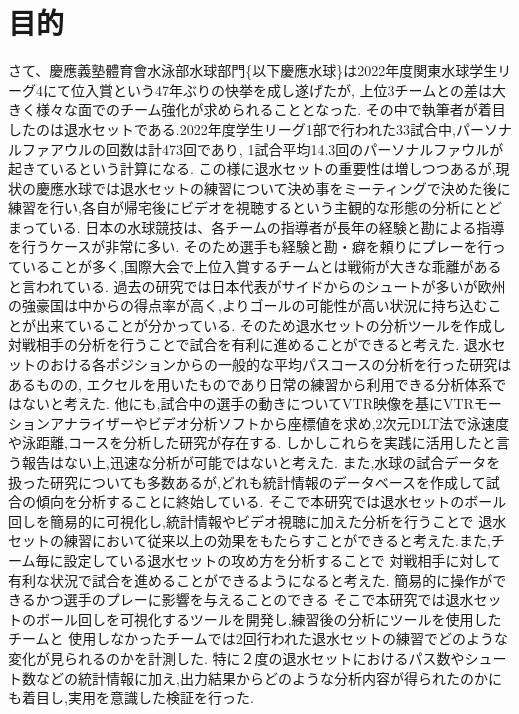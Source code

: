\documentclass[../main.tex]{subfiles}
\begin{document}
\section{目的}
さて、慶應義塾體育會水泳部水球部門\{以下慶應水球\}は2022年度関東水球学生リーグ4にて位入賞という47年ぶりの快挙を成し遂げたが,
上位3チームとの差は大きく様々な面でのチーム強化が求められることとなった.
その中で執筆者が着目したのは退水セットである.2022年度学生リーグ1部で行われた33試合中,パーソナルファアウルの回数は計473回であり,
1試合平均14.3回のパーソナルファウルが起きているという計算になる.
この様に退水セットの重要性は増しつつあるが,現状の慶應水球では退水セットの練習について決め事をミーティングで決めた後に
練習を行い,各自が帰宅後にビデオを視聴するという主観的な形態の分析にとどまっている.
日本の水球競技は、各チームの指導者が長年の経験と勘による指導を行うケースが非常に多い.\cite{原朗2005水球競技の長期一貫指導型競技者育成プログラム}
そのため選手も経験と勘・癖を頼りにプレーを行っていることが多く,国際大会で上位入賞するチームとは戦術が大きな乖離があると言われている.\cite{榎本至2005水球競技のノーティカルチャート}
過去の研究では日本代表がサイドからのシュートが多いが欧州の強豪国は中からの得点率が高く,よりゴールの可能性が高い状況に持ち込むことが出来ていることが分かっている.\cite{高木英樹1988092o09}\cite{洲雅明2018水球競技における相手退水時の攻撃分析}
そのため退水セットの分析ツールを作成し対戦相手の分析を行うことで試合を有利に進めることができると考えた.
退水セットのおける各ポジションからの一般的な平均パスコースの分析を行った研究はあるものの\cite{洲雅明2016水球競技における退水時攻撃のディフェンスの崩しについて},
エクセルを用いたものであり日常の練習から利用できる分析体系ではないと考えた.
他にも,試合中の選手の動きについてVTR映像を基にVTRモーションアナライザーやビデオ分析ソフトから座標値を求め,2次元DLT法で泳速度や泳距離,コースを分析した研究が存在する.\cite{椿本1987水球のゲーム分析}\cite{清水信貴2007水球競技におけるルール改正に伴うゲーム構造の変化に関する研究}\cite{丸山博史水球競技における選手及びボールの移動からみたチームパフォーマンス}\cite{椿本昇三19839043}\cite{福中賢一女子水球選手の国際試合における試合分析}\cite{椿本昇三1987091219}
しかしこれらを実践に活用したと言う報告はない上,迅速な分析が可能ではないと考えた.
また,水球の試合データを扱った研究についても多数あるが,どれも統計情報のデータベースを作成して試合の傾向を分析することに終始している.\cite{洲雅明2013ロンドンオリンピックにおける水球競技のデータ分析}\cite{洲雅明2021水球男子日本チームの世界選手権}\cite{宮城進1985水球競技におけるゲーム分析}\cite{weko_1697_1}\cite{南隆尚1995水球競技におけるゲーム分析}\cite{宮城進1985093231}\cite{榎本至1998095c03102}\cite{高山誠1985093230}
そこで本研究では退水セットのボール回しを簡易的に可視化し,統計情報やビデオ視聴に加えた分析を行うことで
退水セットの練習において従来以上の効果をもたらすことができると考えた.また,チーム毎に設定している退水セットの攻め方を分析することで
対戦相手に対して有利な状況で試合を進めることができるようになると考えた.
簡易的に操作ができるかつ選手のプレーに影響を与えることのできる
そこで本研究では退水セットのボール回しを可視化するツールを開発し,練習後の分析にツールを使用したチームと
使用しなかったチームでは2回行われた退水セットの練習でどのような変化が見られるのかを計測した.
特に２度の退水セットにおけるパス数やシュート数などの統計情報に加え,出力結果からどのような分析内容が得られたのかにも着目し,実用を意識した検証を行った.
\end{document}

